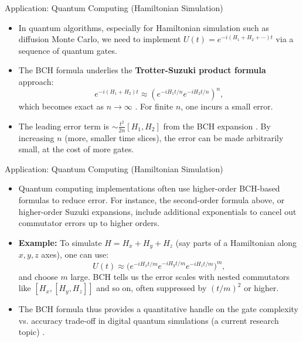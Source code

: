 \documentclass{beamer}
\begin{document}
\begin{frame}{Application: Quantum Computing (Hamiltonian Simulation)}
\begin{itemize}
\item In quantum algorithms, especially for Hamiltonian simulation such as diffusion Monte Carlo, we need to implement $U(t) = e^{-i(H_1+H_2+\cdots) t}$ via a sequence of quantum gates.
\item The BCH formula underlies the \textbf{Trotter-Suzuki product formula} approach:
\[  
e^{-i(H_1+H_2)t} \approx \left(e^{-iH_1 t/n} e^{-iH_2 t/n}\right)^n,
\]
which becomes exact as $n \to \infty$ . For finite $n$, one incurs a small error.
\item The leading error term is $\sim \frac{t^2}{2n}[H_1,H_2]$ from the BCH expansion . By increasing $n$ (more, smaller time slices), the error can be made arbitrarily small, at the cost of more gates.
\end{itemize}
\end{frame}


\begin{frame}{Application: Quantum Computing (Hamiltonian Simulation)}
\begin{itemize}
\item Quantum computing implementations often use higher-order BCH-based formulas to reduce error. For instance, the second-order formula above, or higher-order Suzuki expansions, include additional exponentials to cancel out commutator errors up to higher orders.
\item \textbf{Example:} To simulate $H = H_x + H_y + H_z$ (say parts of a Hamiltonian along $x,y,z$ axes), one can use:
\[  
U(t) \approx \big(e^{-iH_x t/m} e^{-iH_y t/m} e^{-iH_z t/m}\big)^m,
\]
and choose $m$ large. BCH tells us the error scales with nested commutators like $[H_x,[H_y,H_z]]$ and so on, often suppressed by $(t/m)^2$ or higher.
\item The BCH formula thus provides a quantitative handle on the gate complexity vs. accuracy trade-off in digital quantum simulations (a current research topic) .
\end{itemize}
\end{frame}
\end{document}
